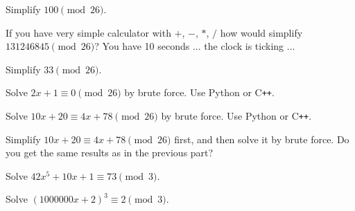 \begin{myenum}
\item Simplify $100 \pmod{26}$.
\item If you have very simple calculator with $+$, $-$, $*$, $/$
how would simplify
$131246845 \pmod{26}$? You have 10 seconds ... the clock is ticking ...
\item Simplify $33 \pmod{26}$.
\item Solve $2x + 1 \equiv 0 \pmod{26}$ by brute force. Use Python or C\texttt{++}.
\item Solve $10x+20 \equiv 4x+78 \pmod{26}$ by brute force. Use Python or C\texttt{++}.
\item Simplify $10x + 20 \equiv 4x + 78 \pmod{26}$ first,
and then solve it by brute
 force. Do you get the same results as in the previous part?
\item Solve $42x^5 + 10x + 1 \equiv 73 \pmod{3}$.
\item Solve $(1000000x + 2)^3 \equiv 2 \pmod{3}$.
\end{myenum}
